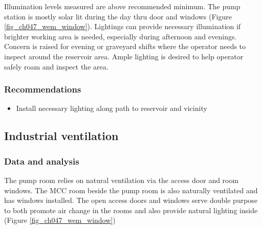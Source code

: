 

Illumination levels measured are above recommended minimum. The pump station is mostly solar lit during the day thru door and windows (Figure \ref{fig_ch047_wem_window}). Lightings can provide necessary illumination if brighter working area is needed, especially during afternoon and evenings. Concern is raised for evening or graveyard shifts where the operator needs to inspect around the reservoir area. Ample lighting is desired to help operator safely roam and inspect the area. 


\subsubsection{Recommendations}

\begin{itemize}
	\item	Install necessary lighting along path to reservoir and vicinity 
	
\end{itemize}


\subsection{Industrial ventilation}\label{aq04}
\subsubsection{Data and analysis}

The pump room relies on natural ventilation via the access door and room windows. The MCC room beside the pump room is also naturally ventilated and has windows installed. The open access doors and windows serve double purpose to both promote air change in the rooms and also provide natural lighting inside (Figure \ref{fig_ch047_wem_window})

